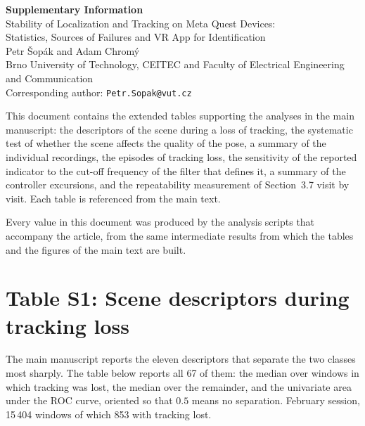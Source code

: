 \documentclass[11pt,a4paper]{article}
\begin{document}
\begin{center}
{\Large\bfseries Supplementary Information}\\[0.6em]
{\large Stability of Localization and Tracking on Meta Quest Devices:\\
Statistics, Sources of Failures and VR App for Identification}\\[0.8em]
Petr \v{S}op\'ak and Adam Chrom\'y\\
Brno University of Technology, CEITEC and Faculty of Electrical Engineering
and Communication\\
Corresponding author: \texttt{Petr.Sopak@vut.cz}
\end{center}

\vspace{1em}

This document contains the extended tables supporting the analyses in the main
manuscript: the descriptors of the scene during a loss of tracking, the
systematic test of whether the scene affects the quality of the pose, a summary
of the individual recordings, the episodes of tracking loss, the sensitivity of
the reported indicator to the cut-off frequency of the filter that defines it,
a summary of the controller excursions, and the repeatability measurement of
Section~3.7 visit by visit. Each table is referenced from the main text.

Every value in this document was produced by the analysis scripts that accompany
the article, from the same intermediate results from which the tables and the
figures of the main text are built.


\section*{Table S1: Scene descriptors during tracking loss}

The main manuscript reports the eleven descriptors that separate the two classes most sharply. The table below reports all 67 of them: the median over windows in which tracking was lost, the median over the remainder, and the univariate area under the ROC curve, oriented so that $0.5$ means no separation. February session, 15\,404 windows of which 853 with tracking lost.
\end{document}
